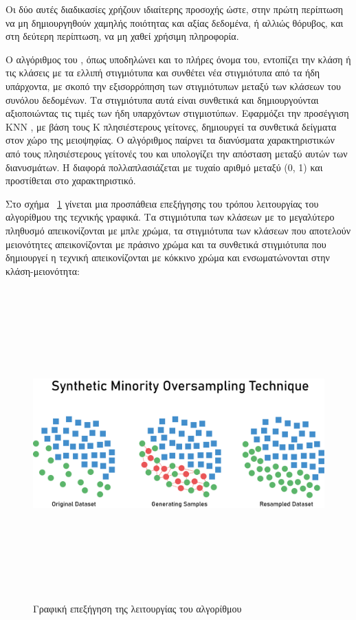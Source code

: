 Οι δύο αυτές διαδικασίες χρήζουν ιδιαίτερης προσοχής ώστε, στην πρώτη περίπτωση να μη δημιουργηθούν χαμηλής ποιότητας και αξίας δεδομένα, ή αλλιώς θόρυβος, και στη δεύτερη περίπτωση, να μη χαθεί χρήσιμη πληροφορία. 

Ο αλγόριθμος του , όπως υποδηλώνει και το πλήρες όνομα του, εντοπίζει την κλάση ή τις κλάσεις με τα ελλιπή στιγμιότυπα και συνθέτει νέα στιγμιότυπα από τα ήδη υπάρχοντα, με σκοπό την εξισορρόπηση των στιγμιότυπων μεταξύ των κλάσεων του συνόλου δεδομένων. Τα στιγμιότυπα αυτά είναι συνθετικά και δημιουργούνται αξιοποιώντας τις τιμές των ήδη υπαρχόντων στιγμιοτύπων. 
Εφαρμόζει την προσέγγιση KNN , με βάση τους K πλησιέστερους γείτονες, δημιουργεί τα συνθετικά δείγματα στον χώρο της μειοψηφίας. Ο αλγόριθμος παίρνει τα διανύσματα χαρακτηριστικών από τους πλησιέστερους γείτονές του και υπολογίζει την απόσταση μεταξύ αυτών των διανυσμάτων. Η διαφορά πολλαπλασιάζεται με τυχαίο αριθμό μεταξύ (0, 1) και προστίθεται στο χαρακτηριστικό.

Στο σχήμα ~\ref{figure5.9} γίνεται μια προσπάθεια επεξήγησης του τρόπου λειτουργίας του αλγορίθμου της τεχνικής  γραφικά. Τα στιγμιότυπα των κλάσεων με το μεγαλύτερο πληθυσμό απεικονίζονται με μπλε χρώμα, τα στιγμιότυπα των κλάσεων που αποτελούν μειονότητες απεικονίζονται με πράσινο χρώμα και τα συνθετικά στιγμιότυπα που δημιουργεί η τεχνική  απεικονίζονται με κόκκινο χρώμα και ενσωματώνονται στην κλάση-μειονότητα:

\begin{figure} [ht!]
\centering
\includegraphics[width=\textwidth,height=12cm,keepaspectratio]{pictures/smote example.png} 
\caption{Γραφική επεξήγηση της λειτουργίας του αλγορίθμου }\label{figure5.9}
\end{figure}



